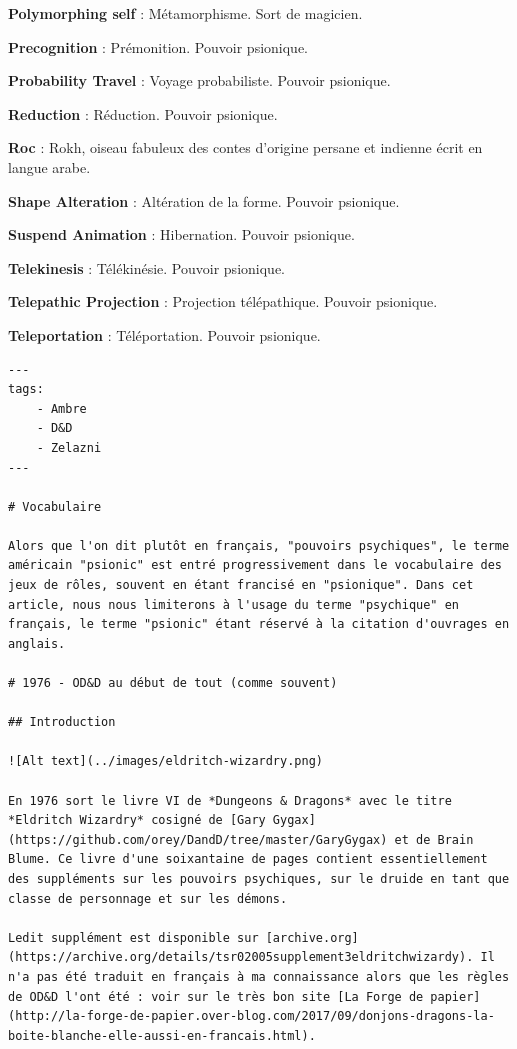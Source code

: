 \documentclass[11pt]{article}
\begin{document}
{{\textbf{Polymorphing self} : Métamorphisme. Sort de magicien.

\textbf{Precognition} : Prémonition. Pouvoir psionique.

\textbf{Probability Travel} : Voyage probabiliste. Pouvoir psionique.

\textbf{Reduction} : Réduction. Pouvoir psionique.

\textbf{Roc} : Rokh, oiseau fabuleux des contes d'origine persane et indienne écrit en langue arabe.

\textbf{Shape Alteration} : Altération de la forme. Pouvoir psionique.

\textbf{Suspend Animation} : Hibernation. Pouvoir psionique.

\textbf{Telekinesis} : Télékinésie. Pouvoir psionique.

\textbf{Telepathic Projection} : Projection télépathique. Pouvoir psionique.

\textbf{Teleportation} : Téléportation. Pouvoir psionique.

}%













\begin{verbatim}
---
tags:
    - Ambre
    - D&D
    - Zelazni
---

# Vocabulaire

Alors que l'on dit plutôt en français, "pouvoirs psychiques", le terme américain "psionic" est entré progressivement dans le vocabulaire des jeux de rôles, souvent en étant francisé en "psionique". Dans cet article, nous nous limiterons à l'usage du terme "psychique" en français, le terme "psionic" étant réservé à la citation d'ouvrages en anglais.

# 1976 - OD&D au début de tout (comme souvent)

## Introduction

![Alt text](../images/eldritch-wizardry.png)

En 1976 sort le livre VI de *Dungeons & Dragons* avec le titre *Eldritch Wizardry* cosigné de [Gary Gygax](https://github.com/orey/DandD/tree/master/GaryGygax) et de Brain Blume. Ce livre d'une soixantaine de pages contient essentiellement des suppléments sur les pouvoirs psychiques, sur le druide en tant que classe de personnage et sur les démons.

Ledit supplément est disponible sur [archive.org](https://archive.org/details/tsr02005supplement3eldritchwizardy). Il n'a pas été traduit en français à ma connaissance alors que les règles de OD&D l'ont été : voir sur le très bon site [La Forge de papier](http://la-forge-de-papier.over-blog.com/2017/09/donjons-dragons-la-boite-blanche-elle-aussi-en-francais.html).


\end{verbatim}}
\end{document}
